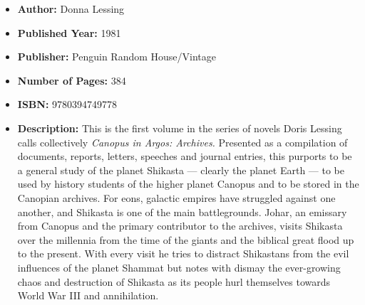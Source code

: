 \documentclass{tufte-handout}
\begin{document}
\begin{itemize}
    \item[] \textbf{Author:} Donna Lessing
    \item[] \textbf{Published Year:} 1981
    \item[] \textbf{Publisher:} Penguin Random House/Vintage
    \item[] \textbf{Number of Pages:} 384      
    \item[] \textbf{ISBN:} 9780394749778
    \item[] \textbf{Description:} This is the first volume in the series of novels Doris Lessing calls collectively \textit{Canopus in Argos: Archives.} Presented as a compilation of documents, reports, letters, speeches and journal entries, this purports to be a general study of the planet Shikasta --- clearly the planet Earth --- to be used by history students of the higher planet Canopus and to be stored in the Canopian archives. For eons, galactic empires have struggled against one another, and Shikasta is one of the main battlegrounds. Johar, an emissary from Canopus and the primary contributor to the archives, visits Shikasta over the millennia from the time of the giants and the biblical great flood up to the present. With every visit he tries to distract Shikastans from the evil influences of the planet Shammat but notes with dismay the ever-growing chaos and destruction of Shikasta as its people hurl themselves towards World War III and annihilation.
\end{itemize}
\end{document}
